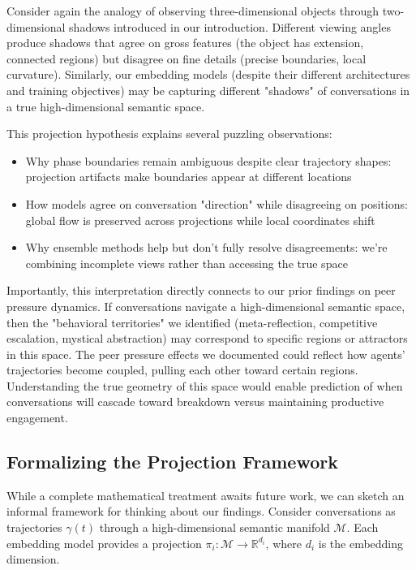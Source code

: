 \documentclass[11pt,letterpaper]{article}
\begin{document}
Consider again the analogy of observing three-dimensional objects through two-dimensional shadows introduced in our introduction. Different viewing angles produce shadows that agree on gross features (the object has extension, connected regions) but disagree on fine details (precise boundaries, local curvature). Similarly, our embedding models (despite their different architectures and training objectives) may be capturing different "shadows" of conversations in a true high-dimensional semantic space.

This projection hypothesis explains several puzzling observations:
\begin{itemize}
\item Why phase boundaries remain ambiguous despite clear trajectory shapes: projection artifacts make boundaries appear at different locations
\item How models agree on conversation "direction" while disagreeing on positions: global flow is preserved across projections while local coordinates shift
\item Why ensemble methods help but don't fully resolve disagreements: we're combining incomplete views rather than accessing the true space
\end{itemize}

Importantly, this interpretation directly connects to our prior findings on peer pressure dynamics. If conversations navigate a high-dimensional semantic space, then the "behavioral territories" we identified (meta-reflection, competitive escalation, mystical abstraction) may correspond to specific regions or attractors in this space. The peer pressure effects we documented could reflect how agents' trajectories become coupled, pulling each other toward certain regions. Understanding the true geometry of this space would enable prediction of when conversations will cascade toward breakdown versus maintaining productive engagement.

\subsection{Formalizing the Projection Framework}

While a complete mathematical treatment awaits future work, we can sketch an informal framework for thinking about our findings. Consider conversations as trajectories $\gamma(t)$ through a high-dimensional semantic manifold $\mathcal{M}$. Each embedding model provides a projection $\pi_i: \mathcal{M} \to \mathbb{R}^{d_i}$, where $d_i$ is the embedding dimension.
\end{document}
